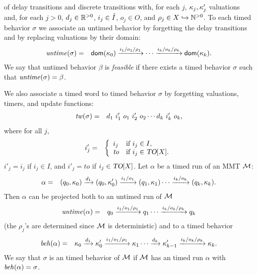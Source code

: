 of delay transitions and discrete transitions with, for each $j$,
$\kappa_j, \kappa'_j$ valuations and,
for each $j>0$,  $d_j \in {\mathbb R}^{> 0}$, $i_j \in \hat{I}$, $o_j \in O$, and $\rho_j \in X \hookrightarrow {\mathbb N}^{>0}$.
To each timed behavior $\sigma$ we associate an untimed behavior by forgetting the
delay transitions and by replacing valuations by their domain:
\begin{eqnarray*}
\mathit{untime}(\sigma) & = & {\textsf{dom}}(\kappa_0) \xrightarrow{i_1/o_1/\rho_1}  \cdots \xrightarrow{i_k/o_k/\rho_k} {\textsf{dom}}(\kappa_k).
\end{eqnarray*}
We say that untimed behavior $\beta$ is \emph{feasible} if there exists a timed behavior $\sigma$ such that $\mathit{untime}(\sigma) = \beta$.

We also associate a timed word to timed behavior $\sigma$ by forgetting valuations, timers, and update functions:
\begin{eqnarray*}
\mathit{tw}(\sigma) & = & d_ 1 ~ i'_1 ~ o_1 ~ i'_2 ~ o_2 \cdots d_k ~ i'_k ~ o_k, 
\end{eqnarray*} 
where for all  $j$,
\iflong
\begin{eqnarray*}
i'_j  & = &  \left\{ \begin{array}{ll}
i_j & \mbox{if } i_j \in I,\\
\mathit{to} & \mbox{if } i_j \in \mbox{\sl TO}[X].
\end{array} \right.
\end{eqnarray*}
\else
$i'_j   =   i_j$ if $i_j \in I$, and
$i'_j   = \mathit{to}$ if $i_j \in \mbox{\sl TO}[X]$.
\fi
Let $\alpha$ be a timed run of an MMT ${\mathcal M}$: 
\begin{eqnarray*}
\alpha & = & (q_0, \kappa_0) \xrightarrow{d_1} (q_0, \kappa'_0) \xrightarrow{i_1/o_1} (q_1, \kappa_1)  \cdots
 \xrightarrow{i_k/o_k} (q_k, \kappa_k).
\end{eqnarray*}
Then $\alpha$ can be projected both to an untimed run of ${\mathcal M}$
\begin{eqnarray*}
\mathit{untime} (\alpha) & = & q_0 \xrightarrow{i_1/o_1/\rho_1} q_1  \cdots \xrightarrow{i_k/o_k/\rho_k} q_k
\end{eqnarray*}
(the $\rho_j$'s are determined since ${\mathcal M}$ is deterministic) and to a timed behavior
\begin{eqnarray*}
\mathit{beh}(\alpha) & = & \kappa_0 \xrightarrow{d_1} \kappa'_0 \xrightarrow{i_1/o_1/\rho_1} \kappa_1  \cdots
\xrightarrow{d_k} \kappa'_{k-1} \xrightarrow{i_k/o_k/\rho_k} \kappa_{k}.
\end{eqnarray*}
We say that $\sigma$ is an timed behavior of ${\mathcal M}$ if ${\mathcal M}$ has an timed run $\alpha$ with $\mathit{beh}(\alpha) = \sigma$.
